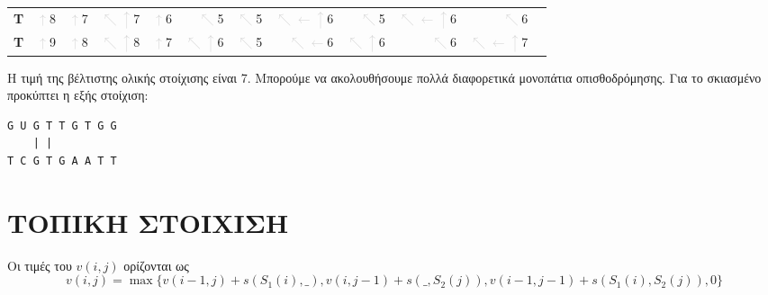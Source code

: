 \begin{table}[ht]
{\begin{tabular}{c|rrrrrrrrrrr}
               \bf{T} & \colorbox{lightgray!25}{\textcolor{lightgray}{\(\uparrow\)}8} & \textcolor{lightgray}{\(\uparrow\)}7 & \textcolor{lightgray}{\(\nwarrow\uparrow\)}7 & \textcolor{lightgray}{\(\uparrow\)}6 & \textcolor{lightgray}{\(\nwarrow\)}5 & \textcolor{lightgray}{\(\nwarrow\)}5 & \textcolor{lightgray}{\(\nwarrow\leftarrow\uparrow\)}6 & \textcolor{lightgray}{\(\nwarrow\)}5 & \colorbox{lightgray!50}{\textcolor{lightgray}{\(\nwarrow\leftarrow\uparrow\)}6} & \textcolor{lightgray}{\(\nwarrow\)}6 \\
               \bf{T} & \colorbox{lightgray!25}{\textcolor{lightgray}{\(\uparrow\)}9} & \textcolor{lightgray}{\(\uparrow\)}8 & \textcolor{lightgray}{\(\nwarrow\uparrow\)}8 & \textcolor{lightgray}{\(\uparrow\)}7 & \textcolor{lightgray}{\(\nwarrow\uparrow\)}6 & \textcolor{lightgray}{\(\nwarrow\)}5 & \textcolor{lightgray}{\(\nwarrow\leftarrow\)}6 & \textcolor{lightgray}{\(\nwarrow\uparrow\)}6 & \textcolor{lightgray}{\(\nwarrow\)}6 & \colorbox{lightgray!50}{\textcolor{lightgray}{\(\nwarrow\leftarrow\uparrow\)}7} \\
                    \end{tabular}}
            \end{table}

        Η τιμή της βέλτιστης ολικής στοίχισης είναι 7. Μπορούμε να ακολουθήσουμε πολλά διαφορετικά μονοπάτια οπισθοδρόμησης.
        Για το σκιασμένο προκύπτει η εξής στοίχιση:

        \begin{graycomment}
            \begin{verbatim}
G U G T T G T G G
    | |
T C G T G A A T T\end{verbatim}
        \end{graycomment}


    \section{ΤΟΠΙΚΗ ΣΤΟΙΧΙΣΗ}

        Οι τιμές του \(v(i,j)\) ορίζονται ως \[ v(i,j) = \max \{v(i-1,j) + s(S_1(i),\_), v(i,j-1) + s(\_, S_2(j)), v(i-1, j-1) + s(S_1(i), S_2(j)), 0\} \]

